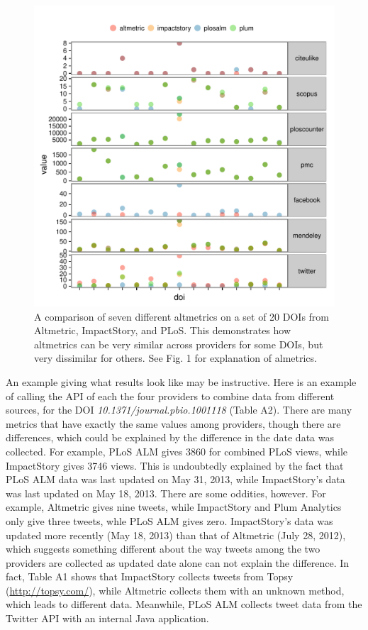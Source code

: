 \documentclass[letterpaper,superscriptaddress,showkeys,longbibliography]{revtex4-1}\usepackage{graphicx, color}
\newenvironment{knitrout}{}{} %
\begin{document}
\begin{knitrout}
\color{fgcolor}\begin{figure}[]


{\centering \includegraphics[width=.7\linewidth]{figure/dataconst2} 

}

\caption[A comparison of seven different altmetrics on a set of 20 DOIs from Altmetric, ImpactStory, and PLoS]{A comparison of seven different altmetrics on a set of 20 DOIs from Altmetric, ImpactStory, and PLoS. This demonstrates how altmetrics can be very similar across providers for some DOIs, but very dissimilar for others. See Fig. 1 for explanation of almetrics.\label{fig:dataconst2}}
\end{figure}


\end{knitrout}


An example giving what results look like may be instructive. Here is an example of calling the API of each the four providers to combine data from different sources, for the DOI \emph{10.1371/journal.pbio.1001118} \cite{arslan2011} (Table A2). There are many metrics that have exactly the same values among providers, though there are differences, which could be explained by the difference in the date data was collected. For example, PLoS ALM gives 3860 for combined PLoS views, while ImpactStory gives 3746 views. This is undoubtedly explained by the fact that PLoS ALM data was last updated on May 31, 2013, while ImpactStory's data was last updated on May 18, 2013. There are some oddities, however. For example, Altmetric gives nine tweets, while ImpactStory and Plum Analytics only give three tweets, whle PLoS ALM gives zero. ImpactStory's data was updated more recently (May 18, 2013) than that of Altmetric (July 28, 2012), which suggests something different about the way tweets among the two providers are collected as updated date alone can not explain the difference. In fact, Table A1 shows that ImpactStory collects tweets from Topsy (\url{http://topsy.com/}), while Altmetric collects them with an unknown method, which leads to different data. Meanwhile, PLoS ALM collects tweet data from the Twitter API with an internal Java application. 
\end{document}
